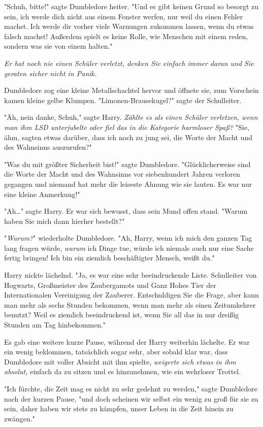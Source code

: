 {"Schuh, bitte!" sagte Dumbledore heiter. "Und es gibt keinen Grund so besorgt zu sein, ich werde dich nicht aus einem Fenster werfen, nur weil du einen Fehler machst. Ich werde dir vorher viele Warnungen zukommen lassen, wenn du etwas falsch machst! Außerdem spielt es keine Rolle, wie Menschen mit einem reden, sondern was sie von einem halten."

\emph{Er hat noch nie einen Schüler verletzt, denken Sie einfach immer daran und Sie geraten sicher nicht in Panik.}

Dumbledore zog eine kleine Metallschachtel hervor und öffnete sie, zum Vorschein kamen kleine gelbe Klumpen. "Limonen-Brausekugel?" sagte der Schulleiter.

"Äh, nein danke, Schuh," sagte Harry. \emph{Zählte es als einen Schüler verletzen, wenn man ihm LSD unterjubelte oder fiel das in die Kategorie harmloser Spaß?} "Sie, ähm, sagten etwas darüber, dass ich noch zu jung sei, die Worte der Macht und des Wahnsinns auszurufen?"

"Was du mit größter Sicherheit bist!" sagte Dumbledore. "Glücklicherweise sind die Worte der Macht und des Wahnsinns vor siebenhundert Jahren verloren gegangen und niemand hat mehr die leiseste Ahnung wie sie lauten. Es war nur eine kleine Anmerkung!"

"Ah…" sagte Harry. Er war sich bewusst, dass sein Mund offen stand. "Warum haben Sie mich dann hierher bestellt?"

"\emph{Warum?}" wiederholte Dumbledore. "Ah, Harry, wenn ich mich den ganzen Tag lang fragen würde, \emph{warum} ich Dinge tue, würde ich niemals auch nur eine Sache fertig bringen! Ich bin ein ziemlich beschäftigter Mensch, weißt du."

Harry nickte lächelnd. "Ja, es war eine sehr beeindruckende Liste. Schulleiter von Hogwarts, Großmeister des Zaubergamots und Ganz Hohes Tier der Internationalen Vereinigung der Zauberer. Entschuldigen Sie die Frage, aber kann man mehr als sechs Stunden bekommen, wenn man mehr als einen Zeitumkehrer benutzt? Weil es ziemlich beeindruckend ist, wenn Sie all das in nur dreißig Stunden am Tag hinbekommen."

Es gab eine weitere kurze Pause, während der Harry weiterhin lächelte. Er war ein wenig beklommen, tatsächlich sogar sehr, aber sobald klar war, dass Dumbledore mit voller Absicht mit ihm spielte, \emph{weigerte sich etwas in ihm absolut,} einfach da zu sitzen und es hinzunehmen, wie ein wehrloser Trottel.

"Ich fürchte, die Zeit mag es nicht zu sehr gedehnt zu werden," sagte Dumbledore nach der kurzen Pause, "und doch scheinen wir selbst ein wenig zu groß für sie zu sein, daher haben wir stets zu kämpfen, unser Leben in die Zeit hinein zu zwängen."

}
